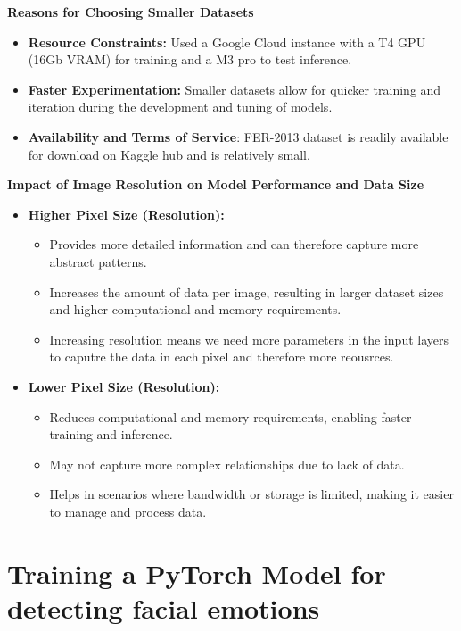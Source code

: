 \documentclass{article}
\begin{document}
\textbf{Reasons for Choosing Smaller Datasets}

\begin{itemize}
    \item \textbf{Resource Constraints:} Used a Google Cloud instance with a T4 GPU (16Gb VRAM) for training and a M3 pro to test inference. 
    \item \textbf{Faster Experimentation:} Smaller datasets allow for quicker training and iteration during the development and tuning of models.
    \item \textbf{Availability and Terms of Service}: FER-2013 dataset is readily available for download on Kaggle hub and is relatively small.
\end{itemize}

\textbf{Impact of Image Resolution on Model Performance and Data Size}

\begin{itemize}
    \item \textbf{Higher Pixel Size (Resolution):}
    \begin{itemize}
        \item Provides more detailed information and can therefore capture more abstract patterns.
        \item Increases the amount of data per image, resulting in larger dataset sizes and higher computational and memory requirements.
        \item Increasing resolution means we need more parameters in the input layers to caputre the data in each pixel and therefore more reousrces.
    \end{itemize}
    \item \textbf{Lower Pixel Size (Resolution):}
    \begin{itemize}
        \item Reduces computational and memory requirements, enabling faster training and inference.
        \item May not capture more complex relationships due to lack of data.
        \item Helps in scenarios where bandwidth or storage is limited, making it easier to manage and process data.
    \end{itemize}
\end{itemize}

\section*{Training a PyTorch Model for detecting facial emotions}
\end{document}
